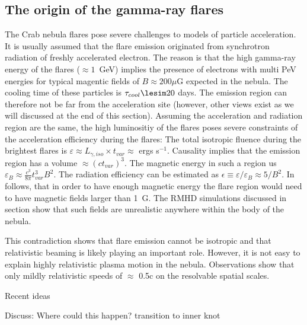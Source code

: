 \subsection{The origin of the gamma-ray flares}

The Crab nebula flares pose severe challenges to models of particle acceleration. It is usually assumed that the flare emission originated from synchrotron radiation of freshly accelerated electron. The reason is that the high gamma-ray energy of the flares ($\approx 1$~GeV) implies the presence of electrons with multi PeV energies for typical magentic fields of $B \approx 200 \mu$G expected in the nebula. The cooling time of these particles is $\tau_{cool} \lesim 20$ days. The emission region can therefore not be far from the acceleration site (however, other views exist as we will discussed at the end of this section). Assuming the acceleration and radiation region are the same, the high luminositiy of the flares poses severe constraints of the acceleration efficiency during the flares: The total isotropic fluence during the brightest flares is $\varepsilon \approx L_{\gamma,iso} \times t_{var} \approx $ ergs s$^{-1}$. Causality implies that the emission region has a volume $\approx (c t_{var})^3$. The magnetic energy in such a region us $\varepsilon_B \approx \frac{c^3}{8 \pi} t_{var}^3 B^2$. The radiation efficiency can be estimated as $\epsilon \equiv \varepsilon / \varepsilon_B \approx  5 / B^2$. In follows, that in order to have enough magnetic energy the flare region would need to have magnetic fields larger than 1~G. The RMHD simulations discussed in section show that such fields are unrealistic anywhere within the body of the nebula. 

This contradiction shows that flare emission cannot be isotropic and that relativistic beaming is likely playing an important role. However, it is not easy to explain highly relativistic plasma motion in the nebula. Observations show that only mildly relativistic speeds of $\approx$ 0.5c on the resolvable spatial scales.


Recent ideas  \cite{Bykov_2012}\cite{Cerutti_2014}\cite{2016arXiv160403179Y}\cite{2015arXiv151205426Z}\cite{2016arXiv160304850N}\cite{2016arXiv160305731L}

Discuss: Where could this happen? transition to inner knot